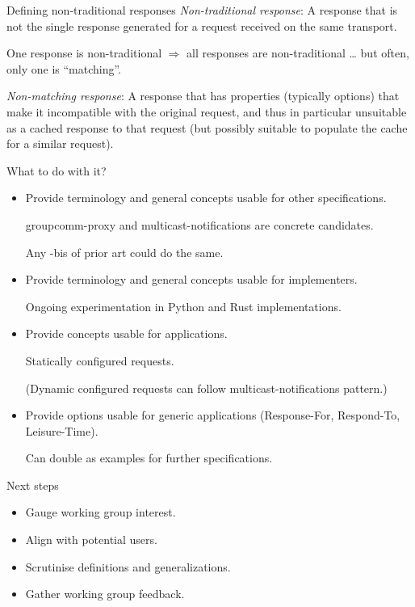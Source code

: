 \documentclass[aspectratio=169]{beamer}
\begin{document}
\begin{frame}{Defining non-traditional responses}\Large
	\textit{Non-traditional response}: A response that is not the single response generated for a request received on the same transport.

	\bigskip

	One response is non-traditional $\Rightarrow$ all responses are non-traditional \ldots{} but often, only one is ``matching''.

	\pause\bigskip

	\textit{Non-matching response}: A response that has properties (typically options) that make it incompatible with the original request, and thus in particular unsuitable as a cached response to that request (but possibly suitable to populate the cache for a similar request).
\end{frame}

\begin{frame}{What to do with it?}\large
	\begin{itemize}
		\item Provide terminology and general concepts usable for other specifications.

			\qquad groupcomm-proxy and multicast-notifications are concrete candidates.

			\qquad Any -bis of prior art could do the same.
		\item Provide terminology and general concepts usable for implementers.

			\qquad Ongoing experimentation in Python and Rust implementations.
		\item Provide concepts usable for applications.

			\qquad Statically configured requests.

			\qquad (Dynamic configured requests can follow multicast-notifications pattern.)

		\item Provide options usable for generic applications (Response-For, Respond-To, Leisure-Time).

			\qquad Can double as examples for further specifications.
	\end{itemize}
\end{frame}

\begin{frame}{Next steps}\Large 
	\begin{itemize}
		\item Gauge working group interest.
		\item Align with potential users.
		\item Scrutinise definitions and generalizations.
		\item Gather working group feedback.
	\end{itemize}

\end{frame}

\end{document}
